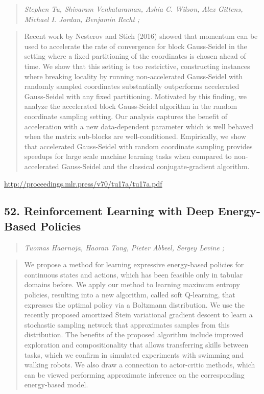 \documentclass{article}
\begin{document}
\begin{quote}
\footnotesize{\textit{Stephen Tu, Shivaram Venkataraman, Ashia C. Wilson, Alex Gittens, Michael I. Jordan, Benjamin Recht ;}}

\end{quote}

\begin{quote}
    Recent work by Nesterov and Stich (2016) showed that momentum can be used to accelerate the rate of convergence for block Gauss-Seidel in the setting where a fixed partitioning of the coordinates is chosen ahead of time. We show that this setting is too restrictive, constructing instances where breaking locality by running non-accelerated Gauss-Seidel with randomly sampled coordinates substantially outperforms accelerated Gauss-Seidel with any fixed partitioning. Motivated by this finding, we analyze the accelerated block Gauss-Seidel algorithm in the random coordinate sampling setting. Our analysis captures the benefit of acceleration with a new data-dependent parameter which is well behaved when the matrix sub-blocks are well-conditioned. Empirically, we show that accelerated Gauss-Seidel with random coordinate sampling provides speedups for large scale machine learning tasks when compared to non-accelerated Gauss-Seidel and the classical conjugate-gradient algorithm.  
\end{quote}

\href{http://proceedings.mlr.press/v70/tu17a/tu17a.pdf}{http://proceedings.mlr.press/v70/tu17a/tu17a.pdf}

\subsection{52. Reinforcement Learning with Deep Energy-Based Policies}

\begin{quote}
\footnotesize{\textit{Tuomas Haarnoja, Haoran Tang, Pieter Abbeel, Sergey Levine ;}}

\end{quote}

\begin{quote}
    We propose a method for learning expressive energy-based policies for continuous states and actions, which has been feasible only in tabular domains before. We apply our method to learning maximum entropy policies, resulting into a new algorithm, called soft Q-learning, that expresses the optimal policy via a Boltzmann distribution. We use the recently proposed amortized Stein variational gradient descent to learn a stochastic sampling network that approximates samples from this distribution. The benefits of the proposed algorithm include improved exploration and compositionality that allows transferring skills between tasks, which we confirm in simulated experiments with swimming and walking robots. We also draw a connection to actor-critic methods, which can be viewed performing approximate inference on the corresponding energy-based model.  
\end{quote}
\end{document}
